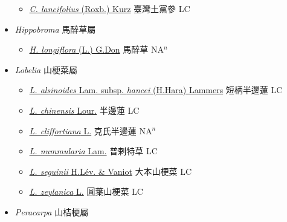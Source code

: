 \begin{itemize}
  \begin{itemize}
        \item[] \href{http://www.theplantlist.org/tpl1.1/search?q=Cyclocodon+lancifolius}{\textit{C. lancifolius} (Roxb.) Kurz}   臺灣土黨參 LC
  \end{itemize}
 \item[] \textit{Hippobroma} 馬醉草屬
                    
  \begin{itemize}
        \item[] \href{http://www.theplantlist.org/tpl1.1/search?q=Hippobroma+longiflora}{\textit{H. longiflora} (L.) G.Don}   馬醉草 NA$^n$
  \end{itemize}
 \item[] \textit{Lobelia} 山梗菜屬
                    
  \begin{itemize}
        \item[] \href{http://www.theplantlist.org/tpl1.1/search?q=Lobelia+alsinoides+subsp.+hancei}{\textit{L. alsinoides} Lam. subsp. \textit{hancei} (H.Hara) Lammers}   短柄半邊蓮 LC
        \item[] \href{http://www.theplantlist.org/tpl1.1/search?q=Lobelia+chinensis}{\textit{L. chinensis} Lour.}   半邊蓮 LC
        \item[] \href{http://www.theplantlist.org/tpl1.1/search?q=Lobelia+cliffortiana}{\textit{L. cliffortiana} L.}   克氏半邊蓮 NA$^n$
        \item[] \href{http://www.theplantlist.org/tpl1.1/search?q=Lobelia+nummularia}{\textit{L. nummularia} Lam.}   普剌特草 LC
        \item[] \href{http://www.theplantlist.org/tpl1.1/search?q=Lobelia+seguinii}{\textit{L. seguinii} H.Lév. \& Vaniot}   大本山梗菜 LC
        \item[] \href{http://www.theplantlist.org/tpl1.1/search?q=Lobelia+zeylanica}{\textit{L. zeylanica} L.}   圓葉山梗菜 LC
  \end{itemize}
 \item[] \textit{Peracarpa} 山桔梗屬
                    

\end{itemize}
